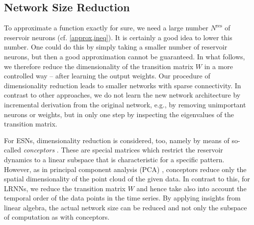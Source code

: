 \documentclass[preprint,12pt,times,authoryear]{elsarticle}%
\theoremstyle{definition}
\begin{document}
\subsection{Network Size Reduction}\label{reduce}

To approximate a function exactly for sure, we need a large number
$N^\mathrm{res}$ of reservoir neurons (cf. \cref{approx,ineq}). It is certainly a
good idea to lower this number. One could do this by simply taking a smaller
number of reservoir neurons, but then a good approximation cannot be guaranteed.
In what follows, we therefore reduce the dimensionality of the transition matrix $W$ in a
more controlled way -- after learning the output weights. Our procedure of
dimensionality reduction leads to smaller networks with sparse connectivity. In
contrast to other approaches, we do not learn the new network architecture by
incremental derivation from the original network, e.g., by removing unimportant
neurons or weights, but in only one step by inspecting the eigenvalues of the
transition matrix.

For ESNs, dimensionality reduction is considered, too, namely by means of
so-called \emph{conceptors} \citep{Jae14,Jae17,KOS21b}. These are special matrices which
restrict the reservoir dynamics to a linear subspace that is characteristic for
a specific pattern. However, as in principal component analysis (PCA) \citep{Jol11}, conceptors
reduce only the spatial dimensionality of the point cloud of the given data. In
contrast to this, for LRNNs, we reduce the transition matrix $W$ and hence take
also into account the temporal order of the data points in the time series. By
applying insights from linear algebra, the actual network size can be reduced
and not only the subspace of computation as with conceptors.
\end{document}
